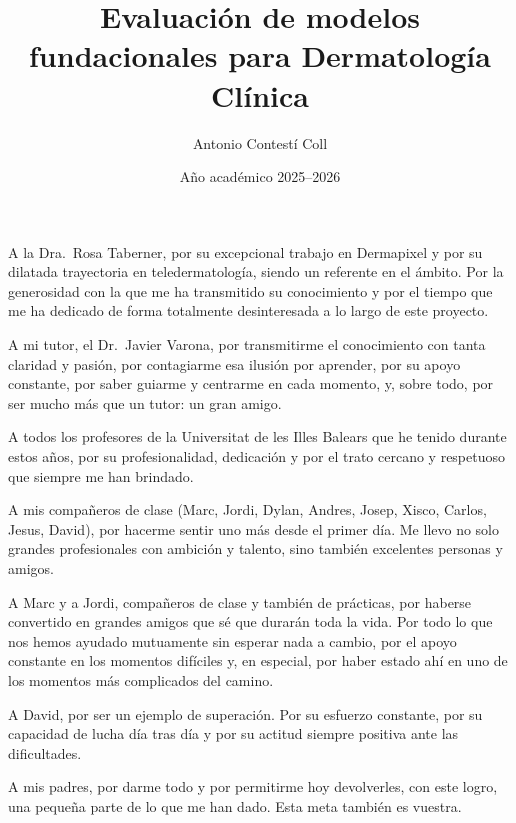 \documentclass[spanish, GINF]{TFGEPSUIB}
\title{Evaluación de modelos fundacionales para Dermatología Clínica}
\author{Antonio Contestí Coll}
\date{Año académico 2025--2026}
\begin{document}
\portada
\portadainterior
\frontmatter

\cleartorecto \thispagestyle{empty}
\vspace*{-3cm}
\begin{agraiments}

A la Dra.~Rosa Taberner, por su excepcional trabajo en Dermapixel y por su dilatada trayectoria en teledermatología, siendo un referente en el ámbito. Por la generosidad con la que me ha transmitido su conocimiento y por el tiempo que me ha dedicado de forma totalmente desinteresada a lo largo de este proyecto.

\medskip

A mi tutor, el Dr.\ Javier Varona, por transmitirme el conocimiento con tanta claridad y pasión, por contagiarme esa ilusión por aprender, por su apoyo constante, por saber guiarme y centrarme en cada momento, y, sobre todo, por ser mucho más que un tutor: un gran amigo.

\medskip

A todos los profesores de la Universitat de les Illes Balears que he tenido durante estos años, por su profesionalidad, dedicación y por el trato cercano y respetuoso que siempre me han brindado.

\medskip

A mis compañeros de clase (Marc, Jordi, Dylan, Andres, Josep, Xisco, Carlos, Jesus, David), por hacerme sentir uno más desde el primer día. Me llevo no solo grandes profesionales con ambición y talento, sino también excelentes personas y amigos.

\medskip

A Marc y a Jordi, compañeros de clase y también de prácticas, por haberse convertido en grandes amigos que sé que durarán toda la vida. Por todo lo que nos hemos ayudado mutuamente sin esperar nada a cambio, por el apoyo constante en los momentos difíciles y, en especial, por haber estado ahí en uno de los momentos más complicados del camino.

\medskip

A David, por ser un ejemplo de superación. Por su esfuerzo constante, por su capacidad de lucha día tras día y por su actitud siempre positiva ante las dificultades.

\medskip

A mis padres, por darme todo y por permitirme hoy devolverles, con este logro, una pequeña parte de lo que me han dado. Esta meta también es vuestra.

\medskip


\end{agraiments}
\end{document}
